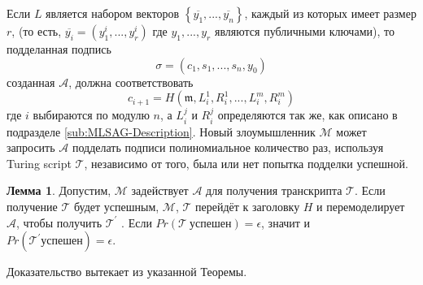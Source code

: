 \documentclass{mrl}
\theoremstyle{definition}
\numberwithin{thm}{section}
\newtheorem{lem}[thm]{Лемма}
\begin{document}
Если $L$ является набором векторов $\left\{ \overline{y_{1}},...,\overline{y_{n}}\right\}$, каждый из которых имеет размер $r$, (то есть, $\overline{y_{i}}=\left(y_{1}^{i},...,y_{r}^{i}\right)$ где $y_{1},...,y_{r}$ являются публичными ключами), то подделанная подпись
\[
\sigma=\left(c_{1},s_{1},...,s_{n},y_{0}\right)
\]
созданная $\mathcal{A}$, должна соответствовать
\[
c_{i+1}=H\left(\mathfrak{m},L_{i}^{1},R_{i}^{1},...,L_{i}^{m},R_{i}^{m}\right)
\]
где $i$ выбираются по модулю $n$, а $L_{i}^{j}$ и $R_{i}^{j}$ определяются так же, как описано в подразделе \ref{sub:MLSAG-Description}. Новый злоумышленник $\mathcal{M}$ может запросить $\mathcal{A}$ подделать подписи полиномиальное количество раз, используя Turing script $\mathcal{T}$, независимо от того, была или нет попытка подделки успешной.
\begin{lem}
\label{lem:RewindingLemma}\cite[Лемма 1]{LWW} %
{} Допустим, $\mathcal{M}$ задействует $\mathcal{A}$ для получения транскрипта $\mathcal{T}$. Если получение $\mathcal{T}$ будет успешным, $\mathcal{M}$, $\mathcal{T}$ перейдёт к заголовку $H$ и перемоделирует $\mathcal{A}$, чтобы получить $\mathcal{T}^{\prime}$ . Если $Pr\left(\mathcal{T}\ \mbox{успешен}\right)=\epsilon$, значит и $Pr\left(\mathcal{T}^{\prime}\mbox{успешен}\right)=\epsilon.$ \end{lem}
Доказательство вытекает из указанной Теоремы.
\end{document}
